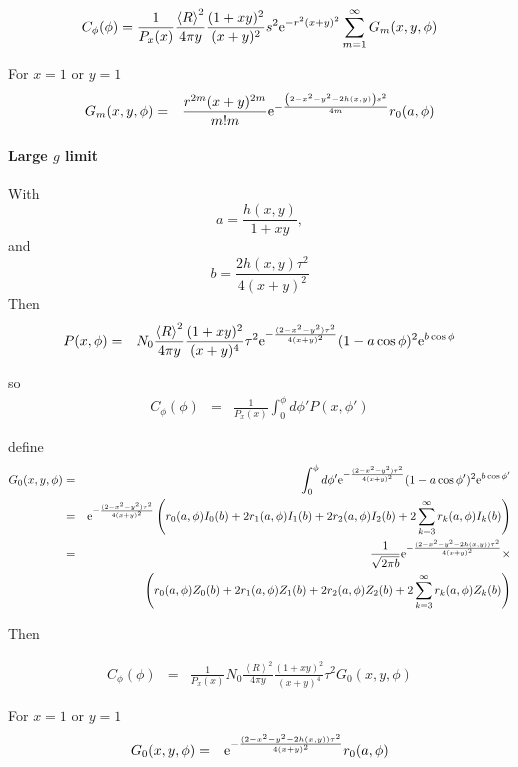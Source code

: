\documentclass[11pt]{article}
\newcommand{\e}{{\rm e}}
\begin{document}
{{{{$$C_{\phi}(\phi)=\frac{1}{P_x(x)}\frac{\left<R\right>^{2}}{4\pi y}\frac{(1+xy)^{2}}{(x+y)^{2}}s^{2}\e^{-r^{2}(x+y)^{2}}\sum_{m=1}^{\infty}G_{m}(x,y,\phi)$$


For $x=1$ or $y=1$
\begin{eqnarray}
G_{m}(x,y,\phi)&=&\frac{r^{2m}(x+y)^{2m}}{m!m}\e^{-\frac{\left(2-x^{2}-y^{2}-2h(x,y)\right)s^{2}}{4m}}r_{0}(a,\phi)\end{eqnarray}

\paragraph{Large $g$ limit}

With
$$a=\frac{h(x,y)}{1+xy},$$
and
$$b=\frac{2h(x,y)\tau^{2}}{4(x+y)^{2}}$$
Then
\begin{eqnarray} P(x,\phi)
&=&N_{0}\frac{\left<R\right>^{2}}{4\pi y}\frac{(1+xy)^{2}}{(x+y)^{4}}\tau^{2}\e^{-\frac{(2-x^{2}-y^{2})\tau^{2}}{4(x+y)^{2}}}(1-a\cos\phi)^{2}\e^{b\cos\phi}\end{eqnarray}

so
\begin{eqnarray}
C_{\phi}(\phi)&=&\frac{1}{P_x(x)}\int_{0}^{\phi}d\phi'P(x,\phi')
\end{eqnarray}

define
\begin{eqnarray}
G_{0}(x,y,\phi)&=&\int_{0}^{\phi}d\phi'\e^{-\frac{(2-x^{2}-y^{2})\tau^{2}}{4(x+y)^{2}}}(1-a\cos\phi')^{2}\e^{b\cos\phi'}\\&=&\e^{-\frac{(2-x^{2}-y^{2})\tau^{2}}{4(x+y)^{2}}}\left(r_{0}(a,\phi)I_{0}(b)+2r_{1}(a,\phi)I_{1}(b)+2r_{2}(a,\phi)I_{2}(b)+2\sum_{k=3}^{\infty}r_{k}(a,\phi)I_{k}(b)\right)\\
&=&\frac{1}{\sqrt{2\pi b}}\e^{-\frac{(2-x^{2}-y^{2}-2h(x,y))\tau^{2}}{4(x+y)^{2}}}\times\\&&\left(r_{0}(a,\phi)Z_{0}(b)+2r_{1}(a,\phi)Z_{1}(b)+2r_{2}(a,\phi)Z_{2}(b)+2\sum_{k=3}^{\infty}r_{k}(a,\phi)Z_{k}(b)\right)
\end{eqnarray}

Then

\begin{eqnarray}
C_{\phi}(\phi)&=&\frac{1}{P_x(x)}N_{0}\frac{\left<R\right>^{2}}{4\pi y}\frac{(1+xy)^{2}}{(x+y)^{4}}\tau^{2}G_{0}(x,y,\phi)
\end{eqnarray}

For $x=1$ or $y=1$
\begin{eqnarray}
G_{0}(x,y,\phi)&=&\e^{-\frac{(2-x^{2}-y^{2}-2h(x,y))\tau^{2}}{4(x+y)^{2}}}r_{0}(a,\phi)
\end{eqnarray}


}}}}
\end{document}
